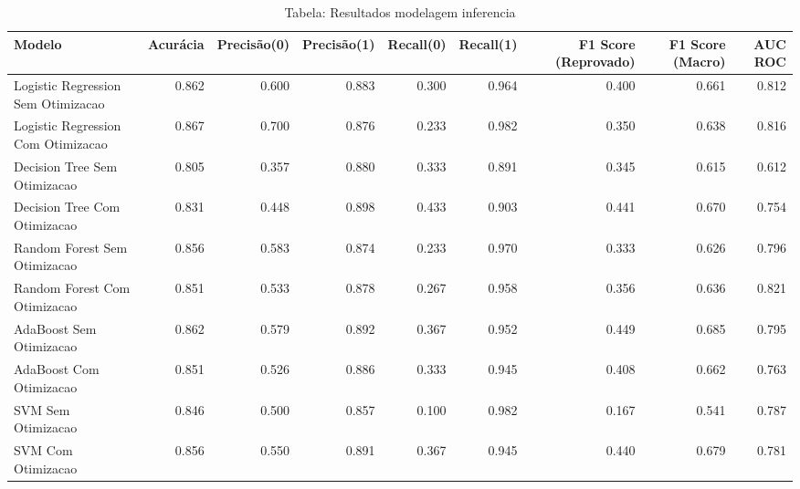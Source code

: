 \begin{table}[H] %
    \centering
    \caption{Tabela: Resultados modelagem inferencia}
    \label{tab:resultados_modelagem_inferencia}
    \renewcommand{\arraystretch}{1.25} %
    \begin{adjustwidth}{ -1in }{ -1in } %
    \centering %
    \small %
    \begin{tabular}{lrrrrrrrr}
\toprule
                            Modelo &  Acurácia &  Precisão(0) &  Precisão(1) &  Recall(0) &  Recall(1) &  F1 Score (Reprovado) &  F1 Score (Macro) &  AUC ROC \\
\midrule
Logistic Regression Sem Otimizacao &     0.862 &        0.600 &        0.883 &      0.300 &      0.964 &                 0.400 &             0.661 &    0.812 \\
Logistic Regression Com Otimizacao &     0.867 &        0.700 &        0.876 &      0.233 &      0.982 &                 0.350 &             0.638 &    0.816 \\
      Decision Tree Sem Otimizacao &     0.805 &        0.357 &        0.880 &      0.333 &      0.891 &                 0.345 &             0.615 &    0.612 \\
      Decision Tree Com Otimizacao &     0.831 &        0.448 &        0.898 &      0.433 &      0.903 &                 0.441 &             0.670 &    0.754 \\
      Random Forest Sem Otimizacao &     0.856 &        0.583 &        0.874 &      0.233 &      0.970 &                 0.333 &             0.626 &    0.796 \\
      Random Forest Com Otimizacao &     0.851 &        0.533 &        0.878 &      0.267 &      0.958 &                 0.356 &             0.636 &    0.821 \\
           AdaBoost Sem Otimizacao &     0.862 &        0.579 &        0.892 &      0.367 &      0.952 &                 0.449 &             0.685 &    0.795 \\
           AdaBoost Com Otimizacao &     0.851 &        0.526 &        0.886 &      0.333 &      0.945 &                 0.408 &             0.662 &    0.763 \\
                SVM Sem Otimizacao &     0.846 &        0.500 &        0.857 &      0.100 &      0.982 &                 0.167 &             0.541 &    0.787 \\
                SVM Com Otimizacao &     0.856 &        0.550 &        0.891 &      0.367 &      0.945 &                 0.440 &             0.679 &    0.781 \\
\bottomrule
\end{tabular}
    \end{adjustwidth}
    \renewcommand{\arraystretch}{1.0} %
\end{table}
